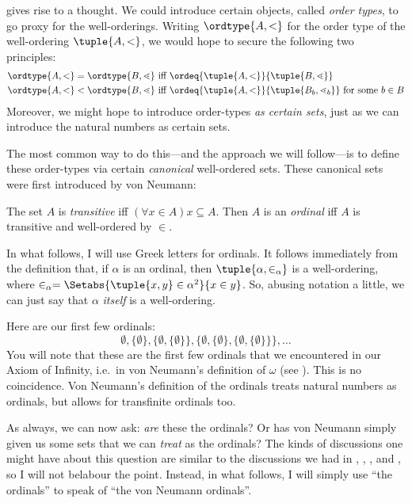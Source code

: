 \documentclass[../../../include/open-logic-section]{subfiles}
\begin{document}
 gives rise to a thought. We could introduce certain objects, called \emph{order types}, to go proxy for the well-orderings. Writing $\ordtype{A, <}$ for the order type of the well-ordering $\tuple{A, <}$, we would hope to secure the following two principles:
\begin{align*}
	\ordtype{A, <} = \ordtype{B, \lessdot}&\text{ iff }\ordeq{\tuple{A, <}}{\tuple{B, \lessdot}}\\
	\ordtype{A, <} < \ordtype{B, \lessdot}&\text{ iff }\ordeq{\tuple{A, <}}{\tuple{B_b, \lessdot_b}}\text{ for some }b \in B
\end{align*}
Moreover, we might hope to introduce order-types \emph{as certain sets}, just as we can introduce the natural numbers as certain sets. 

The most common way to do this---and the approach we will follow---is to define these order-types via certain \emph{canonical} well-ordered sets. These canonical sets were first introduced by von Neumann:
\begin{defn}
	The set $A$ is \emph{transitive} {iff} $(\forall x \in A)x \subseteq A$. Then $A$ is an \emph{ordinal} {iff} $A$ is transitive and well-ordered by $\in$.
\end{defn}\noindent
In what follows, I will use Greek letters for ordinals. It follows immediately from the definition that, if $\alpha$ is an ordinal, then $\tuple{\alpha, \in_\alpha}$ is a well-ordering, where $\in_\alpha = \Setabs{\tuple{x, y} \in \alpha^2}{x \in y}$. So, abusing notation a little, we can just say that $\alpha$ \emph{itself} is a well-ordering. 

Here are our first few ordinals:
	$$\emptyset, \{\emptyset\}, \{\emptyset, \{\emptyset\}\}, \{\emptyset, \{\emptyset\}, \{\emptyset, \{\emptyset\}\}\}, \ldots$$
You will note that these are the first few ordinals that we encountered in our Axiom of Infinity, i.e.\ in von Neumann's definition of $\omega$ (see ). This is no coincidence. Von Neumann's definition of the ordinals treats natural numbers as ordinals, but allows for transfinite ordinals too. 

As always, we can now ask: \emph{are} these the ordinals? Or has von Neumann simply given us some sets that we can \emph{treat} as the ordinals? The kinds of discussions one might have about this question are similar to the discussions we had in , , , and , so I will not belabour the point. Instead, in what follows, I will simply use ``the ordinals'' to speak of ``the von Neumann ordinals''. 
\end{document}
